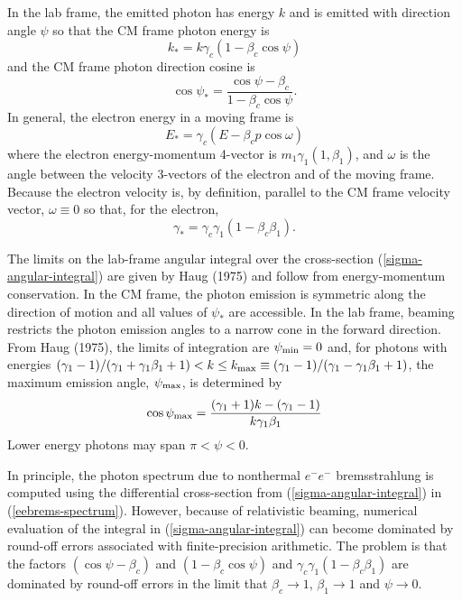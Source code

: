 \documentclass[12pt]{article}
\begin{document}
In the lab frame, the emitted photon has energy $k$ and is
emitted with direction angle $\psi$ so that the
CM frame photon energy is
\begin{equation}
k_* = k \gamma_c \left(1 - \beta_c \cos\psi\right)
\end{equation}
and the CM frame photon direction cosine is
\begin{equation}
\cos\psi_* = \frac{\cos\psi - \beta_c}{1 - \beta_c\cos\psi}.
\end{equation}
In general, the electron energy
in a moving frame is
\begin{equation}
 E_* = \gamma_c \left(E - \beta_c p \cos\omega\right)
\end{equation}
where the electron energy-momentum 4-vector is
$m_1\gamma_1 (1, \beta_1)$, and $\omega$ is the angle between the velocity 3-vectors
of the electron and of the moving frame.  Because the
electron velocity is, by definition, parallel to the
CM frame velocity vector, $\omega \equiv 0$ so that,
for the electron,
\begin{equation}
 \gamma_* = \gamma_c \gamma_1 \left(1 - \beta_c \beta_1\right).
\end{equation}

The limits on the lab-frame angular integral over the
cross-section (\ref{sigma-angular-integral}) are given by Haug
(1975) and follow from energy-momentum conservation.
In the CM frame, the photon emission is symmetric along
the direction of motion and all values of $\psi_*$ are
accessible.  In the lab frame, beaming restricts the photon
emission angles to a narrow cone in the forward direction.
From Haug (1975), the limits of integration are
${\psi_{\rm min}} = 0$ and, for photons with energies
$(\gamma_1 -1)/(\gamma_1 + \gamma_1 \beta_1 + 1) < k \leq k_{\rm
max} \equiv (\gamma_1 -1)/(\gamma_1 - \gamma_1 \beta_1 + 1)$,
the maximum emission angle, $\psi_{\rm max}$, is determined by
\begin{equation}
\cos {\psi_{\rm max}} = \frac{(\gamma_1 + 1)k - (\gamma_1-1)}{k \gamma_1 \beta_1}
\end{equation}
Lower energy photons may span $\pi < \psi < 0$.

In principle, the photon spectrum due to nonthermal $e^-e^-$
bremsstrahlung is computed using the differential cross-section
from (\ref{sigma-angular-integral}) in
(\ref{eebrems-spectrum}). However, because of relativistic
beaming, numerical evaluation of the integral in
(\ref{sigma-angular-integral}) can become dominated by
round-off errors associated with finite-precision arithmetic.
The problem is that the factors $(\cos \psi - \beta_c)$ and $(1
- \beta_c \cos\psi)$ and $\gamma_c\gamma_1(1 - \beta_c
\beta_1)$ are dominated by round-off errors in the limit that
$\beta_c \rightarrow 1$, $\beta_1 \rightarrow 1$ and $\psi
\rightarrow 0$.
\end{document}
